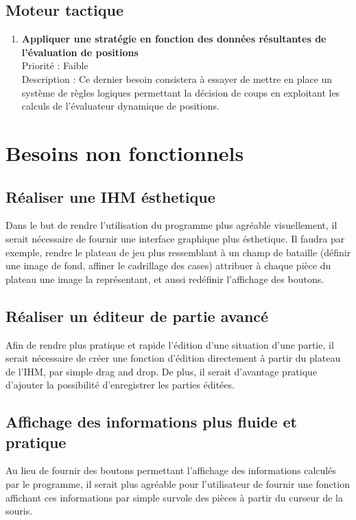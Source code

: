 		\subsection{Moteur tactique}

			\begin{enumerate}

				\item \textbf{Appliquer une stratégie en fonction des données résultantes de l'évaluation de positions} 
				\\[0.7\baselineskip]
				Priorité : Faible 
				\\[0.7\baselineskip]
				Description : Ce dernier besoin consistera à essayer de mettre en place un système de règles logiques permettant la décision de coups en exploitant les 
				calculs de l'évaluateur dynamique de positions. 
				
			\end{enumerate}
	

	\section{Besoins non fonctionnels}
        
                \subsection{Réaliser une IHM ésthetique}
                
                Dans le but de rendre l'utilisation du programme plus agréable visuellement, il serait nécessaire de fournir une interface graphique plus ésthetique.
                Il faudra par exemple, rendre le plateau de jeu plus ressemblant à un champ de bataille (définir une image de fond, affiner le cadrillage des cases) attribuer à chaque pièce du plateau une image la représentant, et aussi redéfinir l'affichage des boutons.

                \subsection{Réaliser un éditeur de partie avancé}

                Afin de rendre plus pratique et rapide l'édition d'une situation d'une partie, il serait nécessaire de créer une fonction d'édition directement à partir du plateau de l'IHM, par simple drag and drop.
                De plus, il serait d'avantage pratique d'ajouter la possibilité d'enregistrer les parties éditées.

                \subsection{Affichage des informations plus fluide et pratique}

                Au lieu de fournir des boutons permettant l'affichage des informations calculés par le programme, il serait plus agréable pour l'utilisateur de fournir une fonction affichant ces informations par simple survole des pièces à partir du curseur de la souris.
